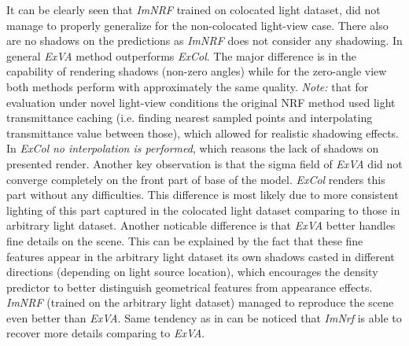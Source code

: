 It can be clearly seen that \textit{ImNRF} trained on colocated light dataset,
did not manage to properly generalize for the non-colocated light-view case.
There also are no shadows on the predictions as \textit{ImNRF} does not consider any shadowing.
In general \textit{ExVA} method outperforms \textit{ExCol}.
The major difference is in the capability of rendering shadows (non-zero angles)
while for the zero-angle view both methods perform with approximately the same quality.
\textit{Note:} that for evaluation under novel light-view conditions the original NRF method used light transmittance caching
(i.e. finding nearest sampled points and interpolating transmittance value between those),
which allowed for realistic shadowing effects.
In \textit{ExCol} \textit{no interpolation is performed}, which reasons the lack of shadows on presented render.
Another key observation is that the sigma field of \textit{ExVA} did not converge completely on the front part of base of the model.
\textit{ExCol} renders this part without any difficulties.
This difference is most likely due to more consistent lighting of this part
captured in the colocated light dataset comparing to those in arbitrary light dataset.
Another noticable difference is that \textit{ExVA} better handles fine details on the scene.
This can be explained by the fact that these fine features appear
in the arbitrary light dataset its own shadows casted in different directions (depending on light source location),
which encourages the density predictor to better distinguish geometrical features from appearance effects.
\textit{ImNRF} (trained on the arbitrary light dataset)
managed to reproduce the scene even better than \textit{ExVA}.
Same tendency as in  can be noticed
that \textit{ImNrf} is able to recover more details comparing to \textit{ExVA}.





% 





